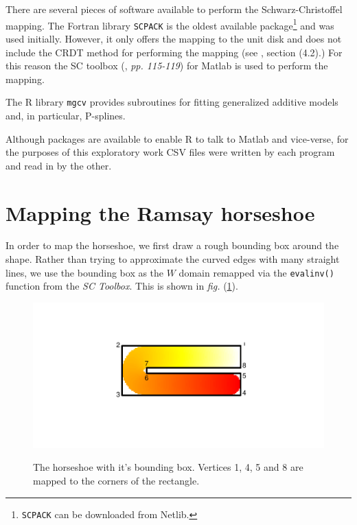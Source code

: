 \documentclass[a4paper,10pt]{amsart}
\newcommand{\sch}{Schwarz-Christoffel }
\newcommand{\fig}[1]{\emph{fig.} (\ref{#1})}
\begin{document}
There are several pieces of software available to perform the \sch mapping. The Fortran library \texttt{SCPACK} is the oldest available package\footnote{\texttt{SCPACK} can be downloaded from Netlib.} and was used initially. However, it only offers the mapping to the unit disk and does not include the CRDT method for performing the mapping (see \cite{miller08}, section (4.2).) For this reason the SC toolbox (\cite{driscoll}, \emph{pp. 115-119}) for Matlab is used to perform the mapping. 

The \textsf{R} library \texttt{mgcv} provides subroutines for fitting generalized additive models and, in particular, P-splines.

Although packages are available to enable \textsf{R} to talk to Matlab and vice-verse, for the purposes of this exploratory work CSV files were written by each program and read in by the other.

\section{Mapping the Ramsay horseshoe}

In order to map the horseshoe, we first draw a rough bounding box around the shape. Rather than trying to approximate the curved edges with many straight lines, we use the bounding box as the $W$ domain remapped via the \texttt{evalinv()} function from the \emph{SC Toolbox}. This is shown in \fig{hswithboundingbox}.

\begin{figure}
\centering
\includegraphics[trim=0.5in 1in 0in 1in]{figs/hswithboundingbox.pdf} \\
\caption{The horseshoe with it's bounding box. Vertices 1, 4, 5 and 8 are mapped to the corners of the rectangle.}
\label{hswithboundingbox}
\end{figure}
\end{document}
